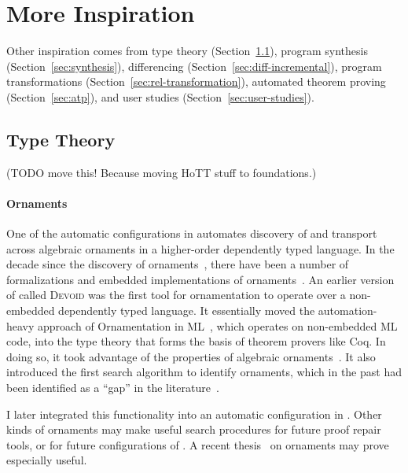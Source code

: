 \section{More Inspiration}
\label{sec:inspiration}

Other inspiration comes from type theory (Section~\ref{sec:typetheory}),
program synthesis (Section~\ref{sec:synthesis}),
differencing (Section~\ref{sec:diff-incremental}),
program transformations (Section~\ref{sec:rel-transformation}),
automated theorem proving (Section~\ref{sec:atp}),
and user studies (Section~\ref{sec:user-studies}).

\subsection{Type Theory}
\label{sec:typetheory}

(TODO move this! Because moving HoTT stuff to foundations.)

\paragraph{Ornaments}
One of the automatic configurations in \toolnamec automates discovery of and transport across algebraic ornaments in a higher-order dependently typed language.
In the decade since the discovery of ornaments~\cite{mcbride}, there have been a number
of formalizations and embedded implementations of ornaments~\cite{Dagand:2013:CTO:2591370.2591396, ko2013relational, dagand2014transporting, ko2016programming, dagand2017essence}.
An earlier version of \toolnamec called \textsc{Devoid} was the first tool for ornamentation to operate over a non-embedded dependently typed language.
It essentially moved the automation-heavy approach of Ornamentation in ML~\cite{Williams2017},
which operates on non-embedded ML code, into the type theory that forms the basis of theorem provers like Coq. 
In doing so, it took advantage of the properties of algebraic ornaments~\cite{mcbride}.
It also introduced the first search algorithm to identify ornaments, which in the past 
had been identified as a ``gap'' in the literature~\cite{ko2016programming}.

I later integrated this functionality into an automatic configuration in \toolnamec.
Other kinds of ornaments may make useful search procedures for future proof repair tools, or for future configurations of \toolnamec.
A recent thesis~\cite{williamsphd} on ornaments may prove especially useful.

